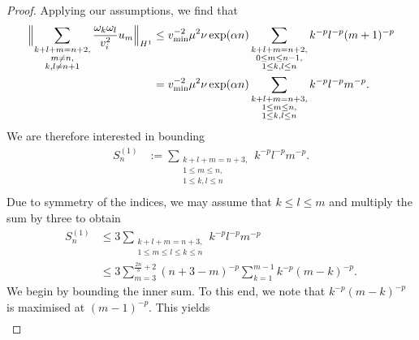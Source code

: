 \documentclass[a4paper,reqno,twoside]{amsart}
\numberwithin{equation}{section}
\theoremstyle{definition}
\newcommand{\<}{\ensuremath \leq}
\renewcommand{\>}{\ensuremath \geq}
\begin{document}
\begin{proof}
    Applying our assumptions, we find that
    \begin{equation}
        \begin{aligned}
            \Bigl\lVert \sum_{\substack{k+l+m = n+2, \\ m \neq n, \\ k, l \neq n+1}}
            \frac{\omega_k \omega_l}{v_i^2} u_m \Bigr\rVert_{H^1}
            &\leq v_{\min}^{-2} \mu^2 \nu \exp(\alpha n)
              \sum_{\substack{k+l+m = n+2, \\ 0 \leq m \leq n-1, \\ 1 \leq k, l \leq n}}
              k^{-p} l^{-p} (m+1)^{-p} \\
            &= v_{\min}^{-2} \mu^2 \nu \exp(\alpha n)
              \sum_{\substack{k+l+m = n+3, \\ 1 \leq m \leq n, \\ 1 \leq k, l \leq n}}
              k^{-p} l^{-p} m^{-p}.
        \end{aligned}
    \end{equation}
    We are therefore interested in bounding
    \begin{equation}
        \begin{aligned}
            S_n^{(1)} &:= \sum_{\substack{k+l+m = n+3, \\ 1 \leq m \leq n, \\ 1 \leq k, l \leq n}}
              k^{-p} l^{-p} m^{-p} .\\
        \end{aligned}
    \end{equation}
    Due to symmetry of the indices, we may assume that $k\leq l \leq m$ and multiply the sum by three to obtain
    \begin{equation}
        \begin{aligned}
           S_n^{(1)} &\leq 3 \sum_{\substack{k+l+m = n+3, \\ 1 \leq m \leq l \leq k \leq n}}
              k^{-p} l^{-p} m^{-p} \\
            &\leq 3 \sum_{m=3}^{\frac{2n}{3}+2}  (n+3-m)^{-p}\sum_{k=1}^{m-1}
              k^{-p} (m-k)^{-p}.
        \end{aligned}
    \end{equation}
    We begin by bounding the inner sum. To this end, we note that $k^{-p} (m-k)^{-p}$ is maximised at $(m-1)^{-p}$. This yields
    \begin{equation}
        \begin{aligned}

\end{aligned}
\end{equation}
\end{proof}
\end{document}
